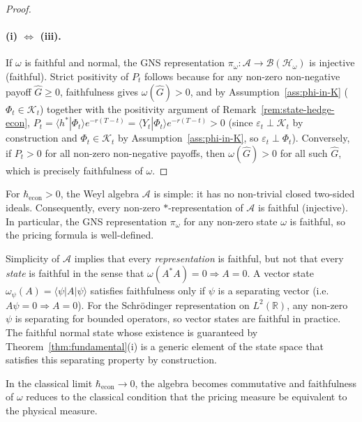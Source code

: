 \begin{proof}
\paragraph{(i) $\Leftrightarrow$ (iii).}
If $\omega$ is faithful and normal, the GNS representation
$\pi_\omega : \mathcal{A} \to \mathcal{B}(\mathcal{H}_\omega)$ is injective
(faithful). Strict positivity of $P_t$ follows because for any non-zero
non-negative payoff $\hat{G} \geq 0$, faithfulness gives
$\omega(\hat{G}) > 0$, and by Assumption~\ref{ass:phi-in-K}
($\Phi_t \in \mathcal{K}_t$) together with the positivity argument of
Remark~\ref{rem:state-hedge-econ},
$P_t = \langle h^* | \Phi_t \rangle e^{-r(T-t)}
= \langle Y_t | \Phi_t \rangle e^{-r(T-t)} > 0$
(since $\varepsilon_t \perp \mathcal{K}_t$ by construction and
$\Phi_t \in \mathcal{K}_t$ by Assumption~\ref{ass:phi-in-K},
so $\varepsilon_t \perp \Phi_t$).
Conversely, if $P_t > 0$ for all non-zero non-negative payoffs, then
$\omega(\hat{G}) > 0$ for all such $\hat{G}$, which is precisely
faithfulness of $\omega$.
\end{proof}

\begin{corollary}\label{cor:no-arb-hbar}
For $\hbar_{\mathrm{econ}} > 0$, the Weyl algebra $\mathcal{A}$ is simple:
it has no non-trivial closed two-sided ideals. Consequently, every non-zero
$*$-representation of $\mathcal{A}$ is faithful (injective). In particular,
the GNS representation $\pi_\omega$ for any non-zero state $\omega$ is
faithful, so the pricing formula is well-defined.

\begin{remark}
Simplicity of $\mathcal{A}$ implies that every \emph{representation} is
faithful, but not that every \emph{state} is faithful in the sense that
$\omega(A^*A) = 0 \Rightarrow A = 0$. A vector state
$\omega_\psi(A) = \langle\psi|A|\psi\rangle$ satisfies faithfulness only if
$\psi$ is a separating vector (i.e.\ $A\psi = 0 \Rightarrow A = 0$). For
the Schr\"{o}dinger representation on $L^2(\mathbb{R})$, any non-zero $\psi$
is separating for bounded operators, so vector states are faithful in
practice. The faithful normal state whose existence is guaranteed by
Theorem~\ref{thm:fundamental}(i) is a generic element of the state space
that satisfies this separating property by construction.
\end{remark}

In the classical limit $\hbar_{\mathrm{econ}} \to 0$, the algebra becomes
commutative and faithfulness of $\omega$ reduces to the classical condition
that the pricing measure be equivalent to the physical measure.
\end{corollary}

